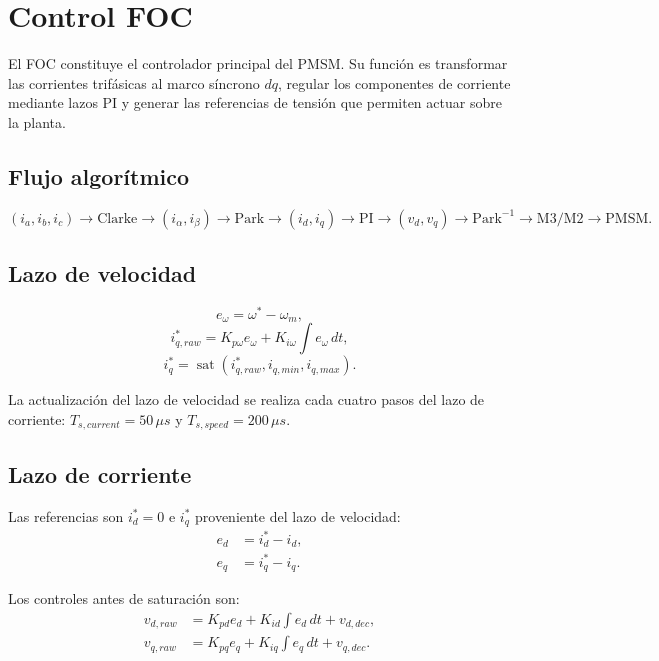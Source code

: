 \section{Control FOC}

El FOC constituye el controlador principal del PMSM. Su función es transformar las corrientes trifásicas al marco síncrono $dq$, regular los componentes de corriente mediante lazos PI y generar las referencias de tensión que permiten actuar sobre la planta.

\subsection{Flujo algorítmico}
\begin{equation}
(i_a,i_b,i_c)\rightarrow\mathrm{Clarke}\rightarrow(i_\alpha,i_\beta)\rightarrow\mathrm{Park}\rightarrow(i_d,i_q)\rightarrow\mathrm{PI}\rightarrow(v_d,v_q)\rightarrow\mathrm{Park}^{-1}\rightarrow\mathrm{M3/M2}\rightarrow\mathrm{PMSM}.
\end{equation}

\subsection{Lazo de velocidad}
\begin{equation}
e_\omega=\omega^*-\omega_m,
\end{equation}
\begin{equation}
i_{q,raw}^*=K_{p\omega}e_\omega+K_{i\omega}\int e_\omega\,dt,
\end{equation}
\begin{equation}
i_q^*=\operatorname{sat}(i_{q,raw}^*,i_{q,min},i_{q,max}).
\end{equation}

La actualización del lazo de velocidad se realiza cada cuatro pasos del lazo de corriente: $T_{s,current}=50\,\mu s$ y $T_{s,speed}=200\,\mu s$.

\subsection{Lazo de corriente}
Las referencias son $i_d^*=0$ e $i_q^*$ proveniente del lazo de velocidad:
\begin{align}
e_d &= i_d^*-i_d,\\
e_q &= i_q^*-i_q.
\end{align}

Los controles antes de saturación son:
\begin{align}
v_{d,raw} &= K_{pd}e_d+K_{id}\int e_d\,dt+v_{d,dec},\\
v_{q,raw} &= K_{pq}e_q+K_{iq}\int e_q\,dt+v_{q,dec}.
\end{align}

